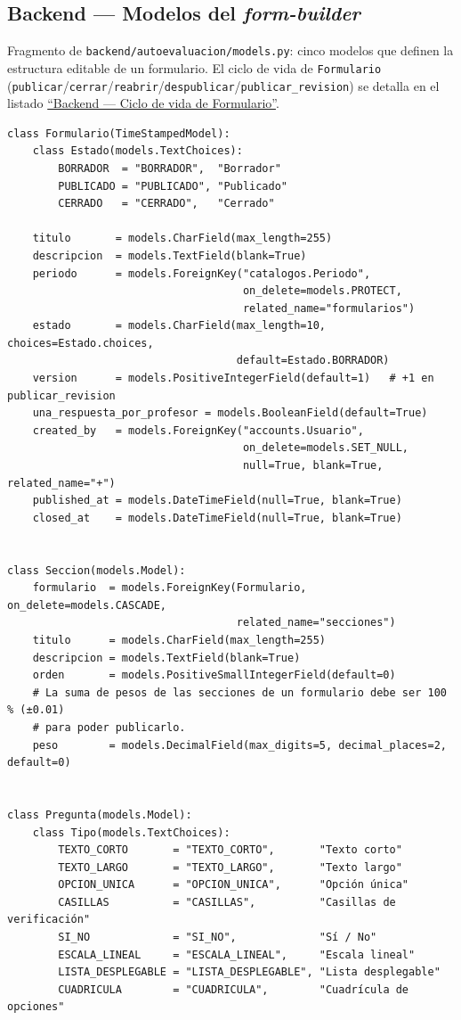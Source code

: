 \subsection{Backend --- Modelos del \emph{form-builder}}\label{lst:modelos_form_builder}

Fragmento de \texttt{backend/autoevaluacion/models.py}: cinco modelos que definen la estructura editable de un formulario. El ciclo de vida de \texttt{Formulario} (\texttt{publicar}/\texttt{cerrar}/\texttt{reabrir}/\texttt{despublicar}/\texttt{publicar\_revision}) se detalla en el listado \hyperref[lst:formulario_states]{``Backend --- Ciclo de vida de Formulario''}.

\begin{Verbatim}[fontsize=\small, frame=single]
class Formulario(TimeStampedModel):
    class Estado(models.TextChoices):
        BORRADOR  = "BORRADOR",  "Borrador"
        PUBLICADO = "PUBLICADO", "Publicado"
        CERRADO   = "CERRADO",   "Cerrado"

    titulo       = models.CharField(max_length=255)
    descripcion  = models.TextField(blank=True)
    periodo      = models.ForeignKey("catalogos.Periodo",
                                     on_delete=models.PROTECT,
                                     related_name="formularios")
    estado       = models.CharField(max_length=10, choices=Estado.choices,
                                    default=Estado.BORRADOR)
    version      = models.PositiveIntegerField(default=1)   # +1 en publicar_revision
    una_respuesta_por_profesor = models.BooleanField(default=True)
    created_by   = models.ForeignKey("accounts.Usuario",
                                     on_delete=models.SET_NULL,
                                     null=True, blank=True, related_name="+")
    published_at = models.DateTimeField(null=True, blank=True)
    closed_at    = models.DateTimeField(null=True, blank=True)


class Seccion(models.Model):
    formulario  = models.ForeignKey(Formulario, on_delete=models.CASCADE,
                                    related_name="secciones")
    titulo      = models.CharField(max_length=255)
    descripcion = models.TextField(blank=True)
    orden       = models.PositiveSmallIntegerField(default=0)
    # La suma de pesos de las secciones de un formulario debe ser 100 % (±0.01)
    # para poder publicarlo.
    peso        = models.DecimalField(max_digits=5, decimal_places=2, default=0)


class Pregunta(models.Model):
    class Tipo(models.TextChoices):
        TEXTO_CORTO       = "TEXTO_CORTO",       "Texto corto"
        TEXTO_LARGO       = "TEXTO_LARGO",       "Texto largo"
        OPCION_UNICA      = "OPCION_UNICA",      "Opción única"
        CASILLAS          = "CASILLAS",          "Casillas de verificación"
        SI_NO             = "SI_NO",             "Sí / No"
        ESCALA_LINEAL     = "ESCALA_LINEAL",     "Escala lineal"
        LISTA_DESPLEGABLE = "LISTA_DESPLEGABLE", "Lista desplegable"
        CUADRICULA        = "CUADRICULA",        "Cuadrícula de opciones"


\end{Verbatim}
